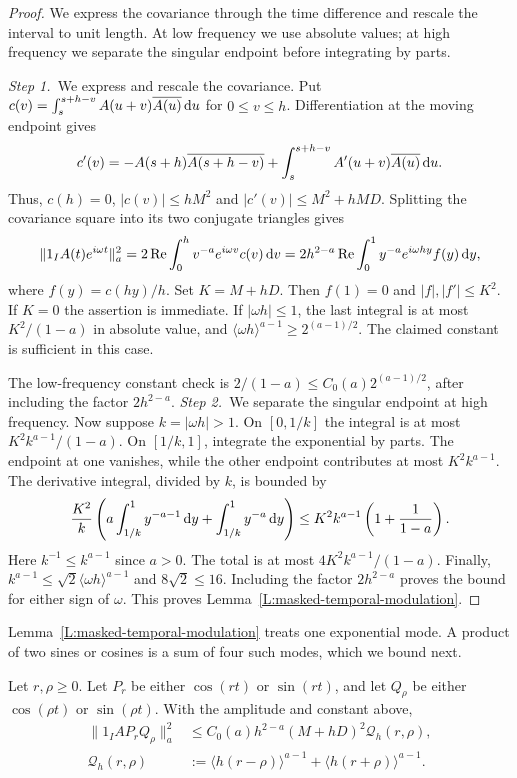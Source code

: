 \begin{proof}
  We express the covariance through the time difference and rescale the
  interval to unit length. At low frequency we use absolute values; at high
  frequency we separate the singular endpoint before integrating by parts.

  \medskip
  \noindent\textit{Step 1.~}We express and rescale the covariance.
  Put $c(v) = \int_s^{s+h-v}A(u+v)\overline{A(u)}\,\mathrm{d} u$ for $0 \le v \le h$.
  Differentiation at the moving endpoint gives
  \[
    c'(v) = -A(s+h)\overline{A(s+h-v)}
    +\int_s^{s+h-v}A'(u+v)\overline{A(u)}\,\mathrm{d} u.
  \]
  Thus, $c(h) = 0$, $|c(v)| \le hM^2$ and $|c'(v)| \le M^2+hMD$. Splitting the
  covariance square into its two conjugate triangles gives
  \[
    \|1_IA(t)e^{i\omega t}\|_a^2
    = 2\operatorname{Re}\int_0^h v^{-a}e^{i\omega v}c(v)\,\mathrm{d} v
    = 2h^{2-a}\operatorname{Re}\int_0^1 y^{-a}e^{i\omega hy}f(y)\,\mathrm{d} y,
  \]
  where $f(y) = c(hy)/h$. Set $K = M+hD$. Then $f(1) = 0$ and $|f|,|f'| \le
  K^2$. If $K = 0$ the assertion is immediate. If $|\omega h| \le 1$, the last
  integral is at most $K^2/(1-a)$ in absolute value, and $\langle\omega
  h\rangle^{a-1} \ge 2^{(a-1)/2}$. The claimed constant is sufficient in this
  case.

  The low-frequency constant check is $2/(1-a)\le C_0(a)2^{(a-1)/2}$, after
  including the factor $2h^{2-a}$.
  \medskip
  \noindent\textit{Step 2.~}We separate the singular endpoint at high
  frequency.
  Now suppose $k = |\omega h| > 1$. On $[0,1/k]$ the integral is at most
  $K^2k^{a-1}/(1-a)$. On $[1/k,1]$, integrate the exponential by parts. The
  endpoint at one vanishes, while the other endpoint contributes at most
  $K^2k^{a-1}$. The derivative integral, divided by $k$, is bounded by
  \[
    \frac{K^2}k\left(a\int_{1/k}^1 y^{-a-1}\,\mathrm{d} y
    +\int_{1/k}^1 y^{-a}\,\mathrm{d} y\right)
    \le K^2 k^{a-1}\left(1+\frac1{1-a}\right).
  \]
  Here $k^{-1} \le k^{a-1}$ since $a > 0$. The total is at most
  $4K^2k^{a-1}/(1-a)$. Finally, $k^{a-1} \le \sqrt{2}\langle\omega
  h\rangle^{a-1}$ and $8\sqrt{2} \le 16$. Including the factor $2h^{2-a}$ proves
  the bound for either sign of $\omega$. This proves
  Lemma~\ref{L:masked-temporal-modulation}.
\end{proof}

Lemma~\ref{L:masked-temporal-modulation} treats one exponential mode. A
product of two sines or cosines is a sum of four such modes, which we bound
next.

\begin{lemma}\label{L:masked-trig-products}
  Let $r,\rho \ge 0$. Let $P_r$ be either $\cos(rt)$ or $\sin(rt)$, and let
  $Q_\rho$ be either $\cos(\rho t)$ or $\sin(\rho t)$. With the amplitude and
  constant above,
  \begin{align}
    \|1_IAP_rQ_\rho\|_a^2
    &\le C_0(a)h^{2-a}(M+hD)^2\mathcal{Q}_h(r,\rho),
    \label{E:masked-trig-products}\\
    \mathcal{Q}_h(r,\rho)
    &:= \langle h(r-\rho)\rangle^{a-1}
    +\langle h(r+\rho)\rangle^{a-1}.
    \label{E:masked-frequency-pair}
  \end{align}
\end{lemma}


